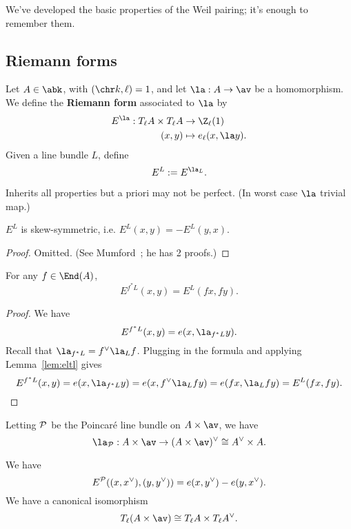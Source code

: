 

We've developed the basic properties of the Weil pairing; it's enough to remember them.
\subsection{Riemann forms}
\begin{df}
Let $A\in \abk$, with $(\chr k,\ell)=1$, and let $\la:A\to \av$ be a homomorphism. We define the \textbf{Riemann form} associated to $\la$ by
\begin{align*}
E^{\la}:T_{\ell}A\times T_{\ell}A&\to \Z_{\ell}(1)\\
(x,y)&\mapsto e_{\ell}(x,\la y).
\end{align*}
Given a line bundle $L$, define
\[
E^L:=E^{\la_L}.
\]
\end{df}

Inherits all properties but a priori may not be perfect. (In worst case $\la$ trivial map.) 
\begin{thm}
$E^L$ is skew-symmetric, i.e. $E^L(x,y)=-E^L(y,x)$.
\end{thm}
\begin{proof}
Omitted. (See Mumford~\cite{Mu70}; he has 2 proofs.)
\end{proof}
\begin{lem}
For any %
$f\in \End(A)$,
\[
E^{f^*L}(x,y)=E^L (fx,fy).
\]
\end{lem}
\begin{proof}
We have
\[
E^{f^*L}(x,y)=e(x,\la_{f^*L} y). 
\]
Recall that $\la_{f^*L}=f^{\vee}\la_L f$. Plugging in the formula and applying Lemma~\ref{lem:eltl} gives
\[
E^{f^*L}(x,y)=e(x,\la_{f^*L} y)=e(x,f^{\vee}\la_L fy) = e(fx,\la_L fy)=E^L(fx,fy).
\]
\end{proof}
Letting $\cal P$ be the Poincar\'e line bundle on $A\times \av$, we have
\[
\la_{\cal P}: A\times \av \to (A\times \av)^{\vee}\cong A^{\vee}\times A.
\]
\begin{lem}
We have
\[
E^{\cal P}((x,x^{\vee}), (y,y^{\vee}))=e(x,y^{\vee})-e(y,x^{\vee}).
\]
We have a canonical isomorphism
\[
T_{\ell}(A\times \av) \cong T_{\ell}A \times T_{\ell}A^{\vee}.
\]
\end{lem}

